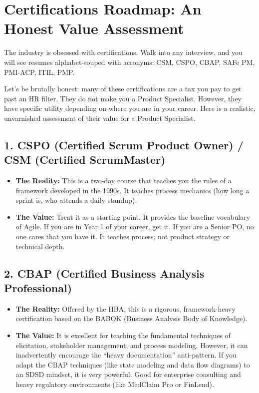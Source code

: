 \bigskip

\section{Certifications Roadmap: An Honest Value
Assessment}\label{certifications-roadmap-an-honest-value-assessment}

The industry is obsessed with certifications. Walk into any interview,
and you will see resumes alphabet-souped with acronyms: CSM, CSPO, CBAP,
SAFe PM, PMI-ACP, ITIL, PMP.

Let's be brutally honest: many of these certifications are a tax you pay
to get past an HR filter. They do not make you a Product Specialist.
However, they have specific utility depending on where you are in your
career. Here is a realistic, unvarnished assessment of their value for a
Product Specialist.

\subsection{1. CSPO (Certified Scrum Product Owner) / CSM (Certified
ScrumMaster)}\label{cspo-certified-scrum-product-owner-csm-certified-scrummaster}

\begin{itemize}
\tightlist
\item
  \textbf{The Reality:} This is a two-day course that teaches you the
  rules of a framework developed in the 1990s. It teaches process
  mechanics (how long a sprint is, who attends a daily standup).
\item
  \textbf{The Value:} Treat it as a starting point. It provides the
  baseline vocabulary of Agile. If you are in Year 1 of your career, get
  it. If you are a Senior PO, no one cares that you have it. It teaches
  process, not product strategy or technical depth.
\end{itemize}

\subsection{2. CBAP (Certified Business Analysis
Professional)}\label{cbap-certified-business-analysis-professional}

\begin{itemize}
\tightlist
\item
  \textbf{The Reality:} Offered by the IIBA, this is a rigorous,
  framework-heavy certification based on the BABOK (Business Analysis
  Body of Knowledge).
\item
  \textbf{The Value:} It is excellent for teaching the fundamental
  techniques of elicitation, stakeholder management, and process
  modeling. However, it can inadvertently encourage the ``heavy
  documentation'' anti-pattern. If you adapt the CBAP techniques (like
  state modeling and data flow diagrams) to an SDSD mindset, it is very
  powerful. Good for enterprise consulting and heavy regulatory
  environments (like MedClaim Pro or FinLend).
\end{itemize}


